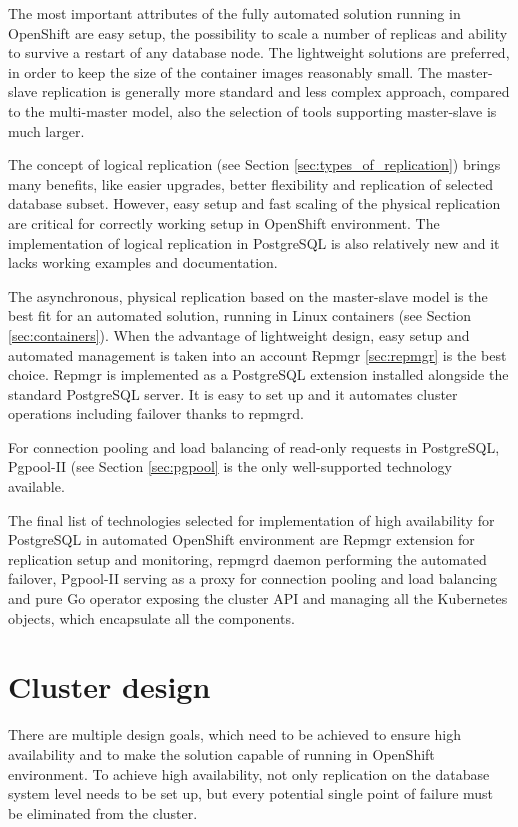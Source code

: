 \documentclass[
  digital, %
  twoside, %
  table,   %
  lof,     %
  lot,     %
]{fithesis3}
\begin{document}
The most important attributes of the fully automated solution running in OpenShift are easy setup, the possibility to scale a number of replicas and ability to survive a restart of any database node. The lightweight solutions are preferred, in order to keep the size of the container images reasonably small. The master-slave replication is generally more standard and less complex approach, compared to the multi-master model, also the selection of tools supporting master-slave is much larger.

The concept of logical replication (see Section \ref{sec:types_of_replication}) brings many benefits, like easier upgrades, better flexibility and replication of selected database subset. However, easy setup and fast scaling of the physical replication are critical for correctly working setup in OpenShift environment. The implementation of logical replication in PostgreSQL is also relatively new and it lacks working examples and documentation.

The asynchronous, physical replication based on the master-slave model is the best fit for an automated solution, running in Linux containers (see Section \ref{sec:containers}). When the advantage of lightweight design, easy setup and automated management is taken into an account Repmgr \ref{sec:repmgr} is the best choice. Repmgr is implemented as a PostgreSQL extension installed alongside the standard PostgreSQL server. It is easy to set up and it automates cluster operations including failover thanks to repmgrd.

For connection pooling and load balancing of read-only requests in PostgreSQL, Pgpool-II (see Section \ref{sec:pgpool} is the only well-supported technology available.

The final list of technologies selected for implementation of high availability for PostgreSQL in automated OpenShift environment are Repmgr extension for replication setup and monitoring, repmgrd daemon performing the automated failover, Pgpool-II serving as a proxy for connection pooling and load balancing and pure Go operator exposing the cluster API and managing all the Kubernetes objects, which encapsulate all the components.

\section{Cluster design}
There are multiple design goals, which need to be achieved to ensure high availability and to make the solution capable of running in OpenShift environment. To achieve high availability, not only replication on the database system level needs to be set up, but every potential single point of failure must be eliminated from the cluster.
\end{document}
